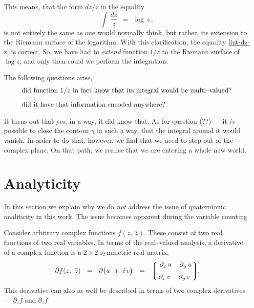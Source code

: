 \documentclass[epsfig,12pt]{article}
\def\beq{\begin{equation}}
\def\eeq{\end{equation}}
\newcommand{\p}{\partial}
\newcommand{\ov}{\overline}
\newcommand{\lgr}{\left\lgroup}
\newcommand{\rgr}{\right\rgroup}
\begin{document}
	This means, that the form $ dz / z $ in the equality
\beq
\label{int-dz-z}
	\int\, \frac{dz} z	~~=~~	\log\,z\,,
\eeq
	is not entirely the same as one would normally think,
	but rather, its extension to the Riemann surface of the logarithm.
	With this clarification, the equality \eqref{int-dz-z} is correct.
	So, we have had to \emph{extend} function $ 1 / z $ to the Riemann surface of $ \log z $,
	and only then could we perform the integration.

	The following questions arise, 
\begin{align*}
	& \text{did function $ 1 / z $ in fact know that its integral would be multi--valued?}\\[2mm]
	& \text{did it have that information encoded anywhere?}
\end{align*}

	It turns out that yes, in a way, it did know that.
	As for question (??) --- it \emph{is} possible to close the contour $ \gamma $ in such a way,
	that the integral around it would vanish.
	In order to do that, however, we find that we need to step out of the complex plane.
	On that path, we realise that we are entering a whole new world.


\newpage
\section{Analyticity}
\label{section-dirac}
\setcounter{equation}{0}

	In this section we explain why we do \emph{not} address the issue of quaternionic analiticity in this work.
	The issue becomes apparent during the variable counting

	Consider arbitrary complex functions $ f(z,~ \ov z) $.
	These consist of two real functions of two real variables.
	In terms of the real--valued analysis, a derivative of a complex function is a $ 2 \times 2 $ symmetric real matrix,
\[
	\p f(z, ~\ov z) 	~~=~~	\p \bigl( u ~+~ i\, v \bigr)	~~=~~
		\lgr \begin{matrix}\,\,
			\p_x\, u	&	\p_y\, u	\\[2mm]
			\p_x\, v	&	\p_y\, v
		\,\,\end{matrix} \rgr\!\!.
\]
	This derivative can also as well be described in terms of two complex derivatives --- $ \p_z f $ and $ \p_{\ov z} f $
\end{document}

